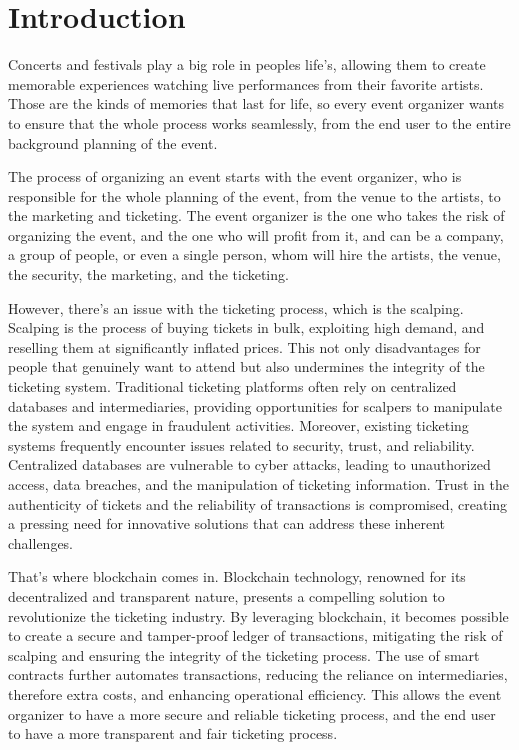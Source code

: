 \chapter{Introduction}
\label{ch:introduction}

Concerts and festivals play a big role in peoples life's, allowing them to
create memorable experiences watching live performances from their favorite
artists. Those are the kinds of memories that last for life, so every event
organizer wants to ensure that the whole process works seamlessly, from the end
user to the entire background planning of the event.

The process of organizing an event starts with the event organizer, who is
responsible for the whole planning of the event, from the venue to the artists,
to the marketing and ticketing. The event organizer is the one who takes the
risk of organizing the event, and the one who will profit from it, and can be a
company, a group of people, or even a single person, whom will hire the
artists, the venue, the security, the marketing, and the ticketing.

However, there's an issue with the ticketing process, which is the scalping.
Scalping is the process of buying tickets in bulk, exploiting high demand, and
reselling them at significantly inflated prices. This not only disadvantages
for people that genuinely want to attend but also undermines the integrity of
the ticketing system. Traditional ticketing platforms often rely on centralized
databases and intermediaries, providing opportunities for scalpers to
manipulate the system and engage in fraudulent activities. Moreover, existing
ticketing systems frequently encounter issues related to security, trust, and
reliability. Centralized databases are vulnerable to cyber attacks, leading to
unauthorized access, data breaches, and the manipulation of ticketing
information. Trust in the authenticity of tickets and the reliability of
transactions is compromised, creating a pressing need for innovative solutions
that can address these inherent challenges.

That's where blockchain comes in. Blockchain technology, renowned for its
decentralized and transparent nature, presents a compelling solution to
revolutionize the ticketing industry. By leveraging blockchain, it becomes
possible to create a secure and tamper-proof ledger of transactions, mitigating
the risk of scalping and ensuring the integrity of the ticketing process. The
use of smart contracts further automates transactions, reducing the reliance on
intermediaries, therefore extra costs, and enhancing operational efficiency.
This allows the event organizer to have a more secure and reliable ticketing
process, and the end user to have a more transparent and fair ticketing
process.






